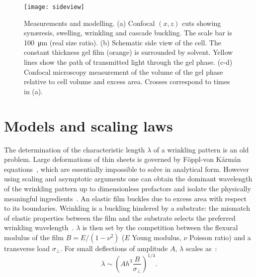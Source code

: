 \documentclass[twocolumn,superscriptaddress,showpacs,preprintnumbers,
amsmath,amssymb,prl]{revtex4-1}
\begin{document}
\begin{figure}
	\texttt{[image: sideview]}
	\caption{Measurements and modelling. (a) Confocal $(x,z)$ cuts showing syn\ae{}resis, swelling, wrinkling and cascade buckling. The scale bar is \SI{100}{\micro\metre} (real size ratio). (b) Schematic side view of the cell. The constant thickness gel film (orange) is surrounded by solvent. Yellow lines show the path of transmitted light through the gel phase. (c-d) Confocal microscopy measurement of the volume of the gel phase relative to cell volume and excess area. Crosses correspond to times in (a).}
	\label{fig:sideview}
\end{figure}

\section*{Models and scaling laws}


The determination of the characteristic length $\lambda$ of a wrinkling pattern is an old problem. Large deformations of thin sheets is governed by F\"{o}ppl-von K\'arm\'an equations~\cite{landau1986}, which are essentially impossible to solve in analytical form. However using scaling and asymptotic arguments one can obtain the dominant wavelength of the wrinkling pattern up to dimensionless prefactors and isolate the physically meaningful ingredients~\cite{Cerda2003}. An elastic film buckles due to excess area with respect to its boundaries. Wrinkling is a buckling hindered by a substrate: the mismatch of elastic properties between the film and the substrate selects the preferred wrinkling wavelength~\cite{Gough1940, Bijlaard1946}. $\lambda$ is then set by the competition between the flexural modulus of the film $B=E/(1-\nu^2)$ ($E$ Young modulus, $\nu$ Poisson ratio) and a transverse load $\sigma_\perp$. For small deflections of  amplitude $A$, $\lambda$ scales as~\cite{Vella2009,Kolinski2009}: 
%
\begin{equation}
\lambda \sim \left( A h^3 \frac{B}{\sigma_{\perp}} \right)^{1/4}.
\label{eq:lstar}
\end{equation}


\end{document}
